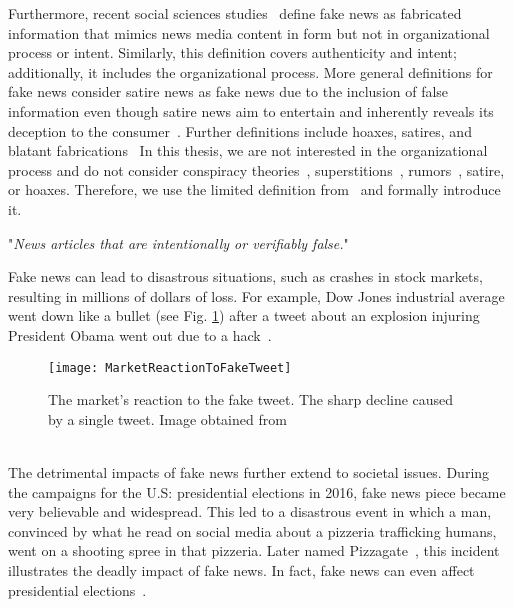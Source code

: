 Furthermore, recent social sciences studies~\parencite{TheScienceOfFakeNews_Lazer, ThePsycologyOfFakeNews_Pennycook} define fake news as fabricated information that mimics news media content in form but not in organizational process or intent. Similarly, this definition covers authenticity and intent; additionally, it includes the organizational process. More general definitions for fake news consider satire news as fake news due to the inclusion of false information even though satire news aim to entertain and inherently reveals its deception to the consumer~\parencite{WhenFakeNewsBecomesReal_Balmas, TheImpactOfRealNewsAboutFakeNews_Brewer, NewsVerificationByExploitingConflictingSocialViewpoints_Jin, FakeNewsOrTruthUsingSatiricalCues_Rubin}. Further definitions include hoaxes, satires, and blatant
fabrications~\parencite{DeceptionDetectionForFakeNews3TypesOfFakeNews_Rubin}
In this thesis, we are not interested in the organizational process and do not consider conspiracy theories~\parencite{ConspiracyTheories_Sunstein}, superstitions~\parencite{Superstition_Lindeman}, rumors~\parencite{RumorsAndHealthCareReform_Berinsky}, satire, or hoaxes. Therefore, we use the limited definition from~\parencite{SocialMediaAndFakeNewsIn2016Election_Allcott} and formally introduce it.
\begin{definition}
    "\emph{News articles that are intentionally or verifiably false.}"~\parencite{SocialMediaAndFakeNewsIn2016Election_Allcott}
\end{definition}
Fake news can lead to disastrous situations, such as crashes in stock markets, resulting in millions of dollars of loss. For example, Dow Jones industrial average went down like a bullet (see Fig. \ref{fig:MarketReactionToFakeTweet}) after a tweet about an explosion injuring President Obama went out due to a hack~\parencite{MarketQuaversAfterFakeAPTweet_ElBoghdady}.
\begin{figure}
    \centering
    \texttt{[image: MarketReactionToFakeTweet]}
    \caption[Market Reaction to Fake Tweet]{The market's reaction to the fake tweet. The sharp decline caused by a single tweet. Image obtained from~\parencite{MarketQuaversAfterFakeAPTweet_ElBoghdady}}\label{fig:MarketReactionToFakeTweet}
\end{figure}\\
The detrimental impacts of fake news further extend to societal issues. During the campaigns for the U.S: presidential elections in 2016, fake news piece became very believable and widespread. This led to a disastrous event in which a man, convinced by what he read on social media about a pizzeria trafficking humans, went on a shooting spree in that pizzeria. Later named Pizzagate~\parencite{Pizzagate_Fisher}, this incident illustrates the deadly impact of fake news. In fact, fake news can even affect presidential elections~\parencite{SocialMediaAndFakeNewsIn2016Election_Allcott, TrumpWonBecauseOfFacebook_Read}.\\
